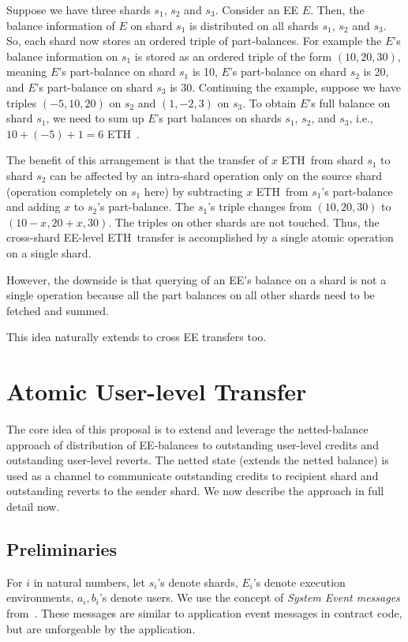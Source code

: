 \documentclass{IEEEtran}
\newcommand{\eth}[0]{ETH~}
\begin{document}
Suppose we have three shards $s_1$, $s_2$ and $s_3$. Consider an EE $E$. Then, the balance information of $E$ on shard $s_1$ is distributed on all shards $s_1$, $s_2$ and $s_3$. So, each shard now stores an ordered triple of part-balances. For example the $E$'s balance information on $s_1$ is stored as an ordered triple of the form $(10, 20, 30)$, meaning $E$'s part-balance on shard $s_1$ is 10, $E$'s part-balance on shard $s_2$ is 20, and $E$'s part-balance on shard $s_3$ is 30. Continuing the example, suppose we have triples $(-5, 10, 20)$ on $s_2$ and $(1,-2,3)$ on $s_3$. To obtain $E$'s full balance on shard $s_1$, we need to sum up $E$'s part balances on shards $s_1$, $s_2$, and $s_3$, i.e., $10 + (-5) + 1 = 6$ \eth. 

The benefit of this arrangement is that the transfer of $x$ \eth from shard $s_1$ to shard $s_2$ can be affected by an intra-shard operation only on the source shard (operation completely on $s_1$ here) by subtracting $x$ \eth from $s_1$'s part-balance and adding $x$ to $s_2$'s part-balance. The $s_1$'s triple changes from $(10, 20, 30)$ to $(10-x, 20+x, 30)$. The triples on other shards are not touched. Thus, the cross-shard EE-level \eth transfer is accomplished by a single atomic operation on a single shard.

However, the downside is that querying of an EE's balance on a shard is not a single operation because all the part balances on all other shards need to be fetched and summed. 

This idea naturally extends to cross EE transfers too.

\section{Atomic User-level Transfer}
\label{sec:atomic-user}
The core idea of this proposal is to extend and leverage the netted-balance approach of distribution of EE-balances to outstanding user-level credits and outstanding user-level reverts. The netted state (extends the netted balance) is used as a channel to communicate outstanding credits to recipient shard and outstanding reverts to the sender shard. We now describe the approach in full detail now.

\subsection{Preliminaries}

For $i$ in natural numbers, let
$s_i$'s denote shards, 
$E_i$'s denote execution environments,
$a_i, b_i$'s denote users.
We use the concept of {\em System Event messages} from~\cite{peter-cross-shard}. These messages are similar to application event messages in contract code, but are unforgeable by the application. 
\end{document}
